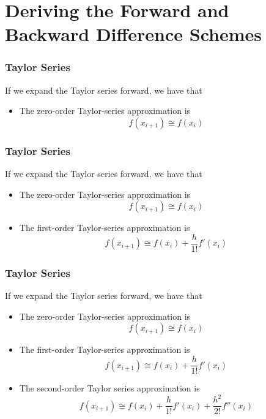 \documentclass{if-beamer}
\begin{document}
\section{Deriving the Forward and Backward Difference Schemes}

\begin{frame}[t]
	\frametitle{Taylor Series}
	
	If we expand the Taylor series forward, we have that 
	\begin{itemize}
		\item 	The zero-order Taylor-series approximation is
		$$f(x_{i+1}) \cong f(x_i) $$
		
	\end{itemize}	
\end{frame}


\begin{frame}[t]
	\frametitle{Taylor Series}
	
	If we expand the Taylor series forward, we have that 
	\begin{itemize}
		\item 	The zero-order Taylor-series approximation is
		$$f(x_{i+1}) \cong f(x_i) $$
		\item The first-order Taylor-series approximation is
		$$f(x_{i+1}) \cong f(x_i) +\frac{h}{1!}f'(x_i) $$
	\end{itemize}	
\end{frame}


\begin{frame}[t]
	\frametitle{Taylor Series}
	
	If we expand the Taylor series forward, we have that 
	\begin{itemize}
		\item 	The zero-order Taylor-series approximation is
		$$f(x_{i+1}) \cong f(x_i) $$
		\item The first-order Taylor-series approximation is
		$$f(x_{i+1}) \cong f(x_i) +\frac{h}{1!}f'(x_i) $$
		\item The second-order Taylor series approximation is 
		$$f(x_{i+1}) \cong f(x_i) +\frac{h}{1!}f'(x_i) + \frac{h^2}{2!}f''(x_i)$$
	\end{itemize}	
\end{frame}
\end{document}
